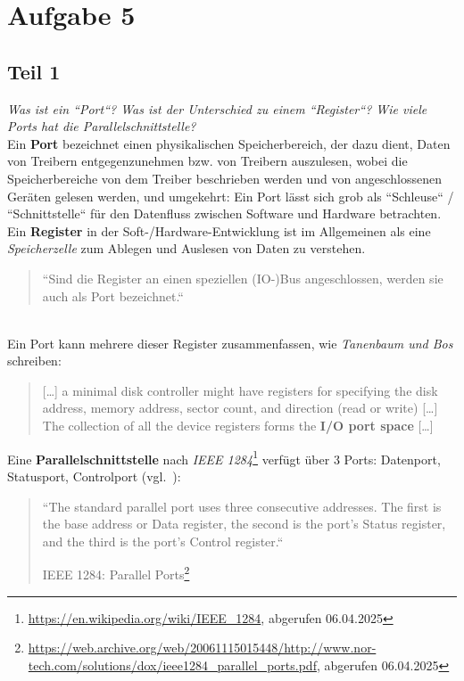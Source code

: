 \chapter{Aufgabe 5}


\section{Teil 1}

\textit{Was ist ein ``Port``? Was ist der Unterschied zu einem ``Register``? Wie
viele Ports hat die Parallelschnittstelle?}\\

\noindent
Ein \textbf{Port} bezeichnet einen physikalischen Speicherbereich, der dazu dient, Daten von Treibern entgegenzunehmen bzw. von Treibern auszulesen, wobei die Speicherbereiche von dem Treiber beschrieben werden und von angeschlossenen Geräten gelesen werden, und umgekehrt:
Ein Port lässt sich grob als ``Schleuse`` / ``Schnittstelle`` für den Datenfluss zwischen Software und Hardware betrachten.\\

\noindent
Ein \textbf{Register} in der Soft-/Hardware-Entwicklung ist im Allgemeinen als eine \textit{Speicherzelle} zum Ablegen und Auslesen von Daten zu verstehen.

\blockquote[{\cite[54]{ES3}}]{
    ``Sind die Register an einen speziellen (IO-)Bus angeschlossen, werden sie auch als Port bezeichnet.``
}\\

\noindent
Ein Port kann mehrere dieser Register zusammenfassen, wie \textit{Tanenbaum und Bos} schreiben:

\blockquote[{\cite[31, Hervorhebung i.O.]{TB24}}]{
[\ldots] a minimal disk controller might have registers for specifying
    the disk address, memory address, sector count, and direction (read or write) [\ldots]
    The collection of all the device registers forms the \textbf{I/O port space} [\ldots]
}

\noindent
Eine \textbf{Parallelschnittstelle} nach \textit{IEEE 1284}\footnote{
\url{https://en.wikipedia.org/wiki/IEEE_1284}, abgerufen 06.04.2025
} verfügt über 3 Ports: Datenport, Statusport, Controlport (vgl.~\cite[54 f.]{ES3}):

\blockquote[{IEEE 1284: Parallel Ports\footnote{\url{https://web.archive.org/web/20061115015448/http://www.nor-tech.com/solutions/dox/ieee1284_parallel_ports.pdf}, abgerufen 06.04.2025}}]{
``The standard parallel port uses three consecutive addresses. The
first is the base address or Data register, the second is the port’s Status register, and the
    third is the port’s Control register.``
}


